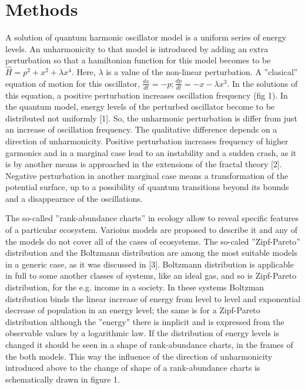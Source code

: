 \documentclass[a4paper]{article}
\begin{document}
\section*{Methods} 


A solution of quantum harmonic oscillator model is a uniform series of energy levels. An unharmonicity to that model is introduced by adding an extra perturbation so that a hamiltonian function for this model becomes to be $\hat H = p^2 + x^2 + \lambda x^4$. Here, $\lambda$ is a value of the non-linear perturbation. A ''clasical'' equation of motion for this oscillator, $\frac{dx}{dt} = -p; \frac{dp}{dt} = -x -\lambda x^3$. In the solutions of this equation, a positive perturbation increases oscillation frequency (fig 1). In the quantum model, energy levels of the perturbed oscillator become to be distributed not uniformly [1]. So, the unharmonic perturbation is differ from just an increase of oscillation frequency. The qualitative difference depends on a direction of unharmonicity. Positive perturbation increases frequency of higher garmonics and in a marginal case lead to an instability and a sudden crash, as it is by another means is approached in the extensions of the fractal theory [2]. Negative perturbation in another marginal case means a transformation of the potential surface, up to a possibility of quantum transitions beyond its bounds and a disappearnce of the oscillations.  

The so-called ''rank-abundance charts'' in ecology allow to reveal specific features of a particular ecosystem. Varioius models are proposed to describe it and any of the models do not cover all of the cases of ecosystems. The so-caled ''Zipf-Pareto'' distribution and the Boltzmann distribution are among the most suitable models in a generic case, as it was discussed in [3]. Boltzmann distribution is applicable in full to some another classes of systems, like an ideal gas, and so is Zipf-Pareto distribution, for the e.g. income in a society. In these systems Boltzman distribution binds the linear increase of energy from level to level and exponential decrease of population in an energy level; the same is for a Zipf-Pareto distribution although the ''energy'' there is implicit and is expressed from the observable values by a logarithmic law. If the distribution of energy levels is changed it should be seen in a shape of rank-abundance charts, in the frames of the both models. This way the influence of the direction of unharmonicity introduced above to the change of shape of a rank-abundance charts is schematically drawn in figure 1.
\end{document}
